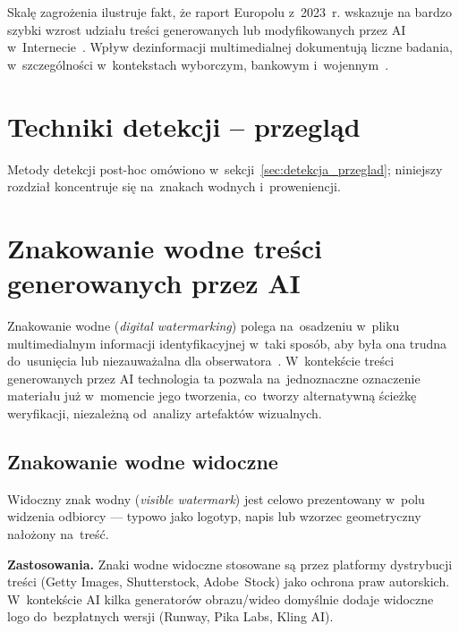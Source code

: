 Skal\k{e} zagro\.{z}enia ilustruje fakt, \.{z}e raport Europolu z~2023~r.
wskazuje na bardzo szybki wzrost udziału treści generowanych lub modyfikowanych
przez AI w~Internecie~\cite{Europol2023Deepfakes}.
Wp\l{}yw dezinformacji multimedialnej dokumentuj\k{a} liczne
badania, w~szczeg\'{o}lno\'{s}ci w~kontekstach wyborczym,
bankowym i~wojennym~\cite{Khan2025ComprehensiveSurvey}.

\section{Techniki detekcji -- przegl\k{a}d}
\label{sec:techniki_detekcji}

Metody detekcji post-hoc om\'{o}wiono w~sekcji~\ref{sec:detekcja_przeglad};
niniejszy rozdzia\l{} koncentruje si\k{e} na~znakach wodnych i~proweniencji.

\section{Znakowanie wodne tre\'{s}ci generowanych przez AI}
\label{sec:watermarking_detail}

Znakowanie wodne (\textit{digital watermarking}) polega na~osadzeniu
w~pliku multimedialnym informacji identyfikacyjnej w~taki spos\'{o}b,
aby by\l{}a ona trudna do~usuni\k{e}cia lub niezauwa\.{z}alna
dla obserwatora~\cite{Luo2025WatermarkingAIGC}.
W~kontek\'{s}cie tre\'{s}ci generowanych przez AI technologia ta
pozwala na~jednoznaczne oznaczenie materia\l{}u ju\.{z} w~momencie
jego tworzenia, co~tworzy alternatywn\k{a} \'{s}cie\.{z}k\k{e}
weryfikacji, niezale\.{z}n\k{a} od~analizy artefakt\'{o}w wizualnych.

\subsection{Znakowanie wodne widoczne}
\label{sec:watermark_visible}

Widoczny znak wodny (\textit{visible watermark}) jest celowo
prezentowany w~polu widzenia odbiorcy --- typowo jako logotyp,
napis lub wzorzec geometryczny na\l{}o\.{z}ony na~tre\'{s}\'{c}.

\textbf{Zastosowania.}
Znaki wodne widoczne stosowane s\k{a} przez platformy
dystrybucji tre\'{s}ci (Getty Images, Shutterstock, Adobe~Stock)
jako ochrona praw autorskich.
W~kontek\'{s}cie AI kilka generator\'{o}w obrazu/wideo
domy\'{s}lnie dodaje widoczne logo do~bezp\l{}atnych wersji
(Runway, Pika Labs, Kling AI).

